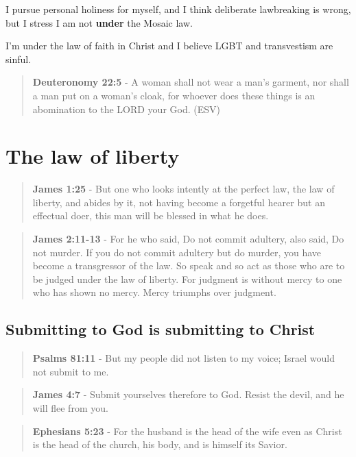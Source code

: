 \documentclass[11pt]{article}
\begin{document}
I pursue personal holiness for myself, and I
think deliberate lawbreaking is wrong,
but I stress I am not \textbf{under} the Mosaic law.

I'm under the law of faith in Christ and I believe
LGBT and transvestism are sinful.

\begin{quote}
\textbf{Deuteronomy 22:5} - A woman shall not wear a man's garment, nor shall a man put on a woman's cloak, for whoever does these things is an abomination to the LORD your God. (ESV)
\end{quote}

\section{The law of liberty}
\label{sec:org9f70301}
\begin{quote}
\textbf{James 1:25} - But one who looks intently at the perfect law, the law of liberty, and abides by it, not having become a forgetful hearer but an effectual doer, this man will be blessed in what he does.
\end{quote}

\begin{quote}
\textbf{James 2:11-13} - For he who said, Do not commit adultery, also said, Do not murder. If you do not commit adultery but do murder, you have become a transgressor of the law.  So speak and so act as those who are to be judged under the law of liberty.  For judgment is without mercy to one who has shown no mercy. Mercy triumphs over judgment.
\end{quote}

\subsection{Submitting to God is submitting to Christ}
\label{sec:orgcb3af59}
\begin{quote}
\textbf{Psalms 81:11} - But my people did not listen to my voice; Israel would not submit to me.
\end{quote}

\begin{quote}
\textbf{James 4:7} - Submit yourselves therefore to God. Resist the devil, and he will flee from you.
\end{quote}

\begin{quote}
\textbf{Ephesians 5:23} - For the husband is the head of the wife even as Christ is the head of the church, his body, and is himself its Savior.
\end{quote}
\end{document}
